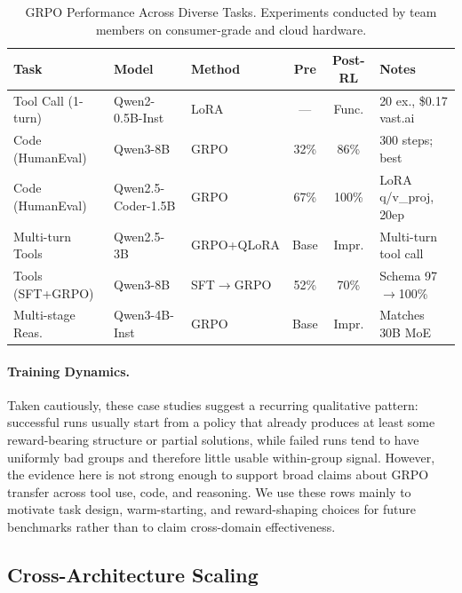 \documentclass{article}
\begin{document}
\begin{table}[t]
\centering
\caption{GRPO Performance Across Diverse Tasks. Experiments conducted by team members
on consumer-grade and cloud hardware.}
\label{tab:task_grpo}
\footnotesize
\begin{tabular}{@{}l l l c c p{2.8cm}@{}}
\toprule
\textbf{Task} & \textbf{Model} & \textbf{Method} & \textbf{Pre} & \textbf{Post-RL} & \textbf{Notes} \\
\midrule
Tool Call (1-turn) & Qwen2-0.5B-Inst & LoRA & --- & Func. & 20 ex., \$0.17 vast.ai \\
Code (HumanEval) & Qwen3-8B & GRPO & 32\% & 86\% & 300 steps; best \\
Code (HumanEval) & Qwen2.5-Coder-1.5B & GRPO & 67\% & 100\% & LoRA q/v\_proj, 20ep \\
Multi-turn Tools & Qwen2.5-3B & GRPO+QLoRA & Base & Impr. & Multi-turn tool call \\
Tools (SFT+GRPO) & Qwen3-8B & SFT$\to$GRPO & 52\% & 70\% & Schema 97$\to$100\% \\
Multi-stage Reas. & Qwen3-4B-Inst & GRPO & Base & Impr. & Matches 30B MoE \\
\bottomrule
\end{tabular}
\end{table}

\paragraph{Training Dynamics.}
Taken cautiously, these case studies suggest a recurring qualitative pattern:
successful runs usually start from a policy that already produces at least some
reward-bearing structure or partial solutions, while failed runs tend to have
uniformly bad groups and therefore little usable within-group signal.
However, the evidence here is not strong enough to support broad claims about
GRPO transfer across tool use, code, and reasoning. We use these rows mainly
to motivate task design, warm-starting, and reward-shaping choices for future
benchmarks rather than to claim cross-domain effectiveness.

\subsection{Cross-Architecture Scaling}
\label{sec:cross_arch_scaling}
\end{document}

